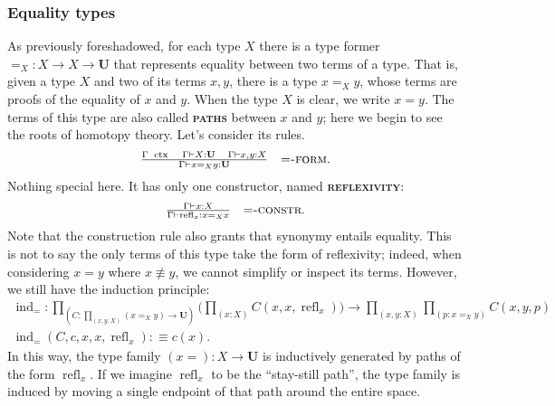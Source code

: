 \documentclass{article}
\newcommand{\defn}[1]{{\scshape\bfseries\color{MPBemph}#1}}
\newcommand{\infrule}[3]{\genfrac{}{}{}{}{#1}{#2}\hspace{1em}{\textsc{#3}}}
\DeclareMathOperator{\ctx}{~ctx}
\newcommand{\gives}{\vdash}
\newcommand{\eql}{\mathbin{:\equiv}}
\newcommand{\U}{\mathbf{U}}
\newcommand{\tpi}[1]{\prod_{(#1)}}
\DeclareMathOperator{\ind}{ind}
\newcommand{\1}{\textbf{1}}
\newcommand{\0}{\mathbf{0}}
\newcommand{\2}{\textbf{2}}
\DeclareMathOperator{\refl}{refl}
\begin{document}
\subsubsection{Equality types}
As previously foreshadowed, for each type \( X \) there is a type former \( {=_{X}} : X \to X \to \U \) that represents equality between two terms of a type. That is, given a type \( X \) and two of its terms \( x, y \), there is a type \( x =_{X} y \), whose terms are proofs of the equality of \( x \) and \( y \). When the type \( X \) is clear, we write \( x = y \). The terms of this type are also called \defn{paths} between \( x \) and \( y \); here we begin to see the roots of homotopy theory. Let's consider its rules.
\[ \OD \infrule{\Gamma \ctx \hspace{1em} \Gamma \gives X : \U \hspace{1em} \Gamma \gives x, y : X}{\Gamma \gives x =_{X} y : \U}{\( = \)-form}. \]
Nothing special here. It has only one constructor, named \defn{reflexivity}:
\[ \OD \infrule{\Gamma \gives x : X}{\Gamma \gives \refl_{x} : x =_{X} x}{\( = \)-constr}. \]
Note that the construction rule also grants that synonymy entails equality. This is not to say the only terms of this type take the form of reflexivity; indeed, when considering \( x = y \) where \( x \not\equiv y \), we cannot simplify or inspect its terms. However, we still have the induction principle:
\[ \begin{array}{c}
	\ind_{=} : \tpi{C : \tpi{x, y : X} (x =_{X} y) \to \U} \big( \tpi{x : X} C(x, x, \refl_{x}) \big) \to \tpi{x, y : X} \tpi{p : x =_{X} y} C(x, y, p) \\[3pt]
	\ind_{=}(C, c, x, x, \refl_{x}) \eql c(x).
\end{array} \]
In this way, the type family \( (x =) : X \to \U \) is inductively generated by paths of the form \( \refl_{x} \). If we imagine \( \refl_{x} \) to be the ``stay-still path'', the type family is induced by moving a single endpoint of that path around the entire space.%
\end{document}
